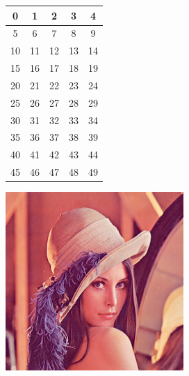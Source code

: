 \documentclass[12pt]{article}
\begin{document}
\begin{tabular}{|c|c|c|c|c|}
  \hline
  0 & 1 & 2 & 3 & 4 \\ \hline
  5 & 6 & 7 & 8 & 9 \\ \hline
  10 & 11 & 12 & 13 & 14 \\ \hline
  15 & 16 & 17 & 18 & 19 \\ \hline
  20 & 21 & 22 & 23 & 24 \\ \hline
  25 & 26 & 27 & 28 & 29 \\ \hline
  30 & 31 & 32 & 33 & 34 \\ \hline
  35 & 36 & 37 & 38 & 39 \\ \hline
  40 & 41 & 42 & 43 & 44 \\ \hline
  45 & 46 & 47 & 48 & 49 \\ \hline
\end{tabular}

\includegraphics{Lenna.png}
\end{document}
